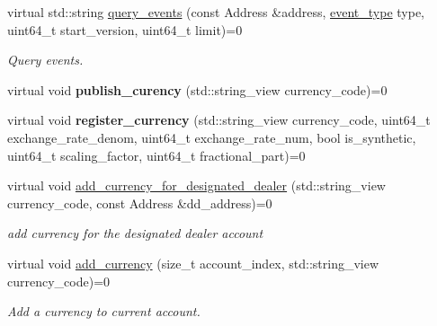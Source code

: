 \begin{DoxyCompactItemize}
virtual std\+::string \hyperlink{classviolas_1_1_client_ac3ff1015d91b72c78133a5b286a3f6aa}{query\+\_\+events} (const Address \&address, \hyperlink{classviolas_1_1_client_adee90625a7043bafdbb30931d564f6f4}{event\+\_\+type} type, uint64\+\_\+t start\+\_\+version, uint64\+\_\+t limit)=0
\begin{DoxyCompactList}\small\item\em Query events. \end{DoxyCompactList}\item 
\mbox{\label{classviolas_1_1_client_ad3644d27093e9ddb77fd69264a564b50}} 
virtual void {\bfseries publish\+\_\+curency} (std\+::string\+\_\+view currency\+\_\+code)=0
\item 
\mbox{\label{classviolas_1_1_client_a83a763c661ef099eeefd692ebd16a323}} 
virtual void {\bfseries register\+\_\+currency} (std\+::string\+\_\+view currency\+\_\+code, uint64\+\_\+t exchange\+\_\+rate\+\_\+denom, uint64\+\_\+t exchange\+\_\+rate\+\_\+num, bool is\+\_\+synthetic, uint64\+\_\+t scaling\+\_\+factor, uint64\+\_\+t fractional\+\_\+part)=0
\item 
\mbox{\label{classviolas_1_1_client_a4fdf4a8af36c33c06f6907ac7611e6e3}} 
virtual void \hyperlink{classviolas_1_1_client_a4fdf4a8af36c33c06f6907ac7611e6e3}{add\+\_\+currency\+\_\+for\+\_\+designated\+\_\+dealer} (std\+::string\+\_\+view currency\+\_\+code, const Address \&dd\+\_\+address)=0
\begin{DoxyCompactList}\small\item\em add currency for the designated dealer account \end{DoxyCompactList}\item 
\mbox{\label{classviolas_1_1_client_acc748841260b3eaca26ec3a2c22b5eef}} 
virtual void \hyperlink{classviolas_1_1_client_acc748841260b3eaca26ec3a2c22b5eef}{add\+\_\+currency} (size\+\_\+t account\+\_\+index, std\+::string\+\_\+view currency\+\_\+code)=0
\begin{DoxyCompactList}\small\item\em Add a currency to current account. \end{DoxyCompactList}\item 
\mbox{\label{classviolas_1_1_client_a7e5c7f111c7b04a3b33fd4c52c9a7abb}} 

\end{DoxyCompactItemize}
